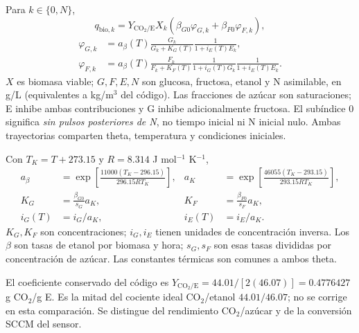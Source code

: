 \documentclass[10pt,a4paper]{article}
\begin{document}
Para $k\in\{0,N\}$,
\begin{equation}
q_{\mathrm{bio},k}=Y_{\mathrm{CO_2/E}}X_k
\left(\beta_{G0}\varphi_{G,k}+\beta_{F0}\varphi_{F,k}\right),
\label{eq:raw}
\end{equation}
\begin{align}
\varphi_{G,k}&=a_\beta(T)\frac{G_k}{G_k+K_G(T)}
\frac{1}{1+i_E(T)E_k},\label{eq:phiG}\\
\varphi_{F,k}&=a_\beta(T)\frac{F_k}{F_k+K_F(T)}
\frac{1}{1+i_G(T)G_k}\frac{1}{1+i_E(T)E_k}.\label{eq:phiF}
\end{align}
$X$ es biomasa viable; $G,F,E,N$ son glucosa, fructosa, etanol y N asimilable,
en g/L (equivalentes a kg/m$^3$ del código). Las fracciones de azúcar son
saturaciones; E inhibe ambas contribuciones y G inhibe adicionalmente
fructosa. El subíndice 0 significa \emph{sin pulsos posteriores de N}, no
tiempo inicial ni N inicial nulo. Ambas trayectorias comparten theta,
temperatura y condiciones iniciales.

Con $T_K=T+273.15$ y $R=8.314$ J mol$^{-1}$ K$^{-1}$,
\begin{align}
a_\beta&=\exp\!\left[\frac{11000(T_K-296.15)}{296.15RT_K}\right],&
a_K&=\exp\!\left[\frac{46055(T_K-293.15)}{293.15RT_K}\right],\label{eq:thermal}\\
K_G&=\frac{\beta_{G0}}{s_G}a_K,&K_F&=\frac{\beta_{F0}}{s_F}a_K,\label{eq:K}\\
i_G(T)&=i_G/a_K,&i_E(T)&=i_E/a_K.\label{eq:i}
\end{align}
$K_G,K_F$ son concentraciones; $i_G,i_E$ tienen unidades de concentración
inversa. Los $\beta$ son tasas de etanol por biomasa y hora; $s_G,s_F$ son
esas tasas divididas por concentración de azúcar. Las constantes térmicas
son comunes a ambos theta.

El coeficiente conservado del código es
$Y_{\mathrm{CO_2/E}}=44.01/[2(46.07)]=0.4776427$ g CO\(_2\)/g E.
Es la mitad del cociente ideal CO\(_2\)/etanol $44.01/46.07$; no se corrige
en esta comparación. Se distingue del rendimiento CO\(_2\)/azúcar y de la
conversión SCCM del sensor.
\end{document}

